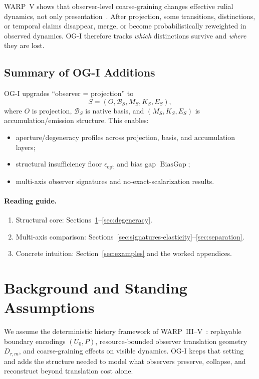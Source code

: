 \documentclass[11pt,twoside]{article}
\theoremstyle{definition}
\DeclareMathOperator{\BiasGap}{BiasGap}
\begin{document}
WARP~V shows that observer-level coarse-graining changes effective rulial dynamics, not only presentation~\cite{ross_paper_v}. After projection, some transitions, distinctions, or temporal claims disappear, merge, or become probabilistically reweighted in observed dynamics. OG-I therefore tracks \emph{which} distinctions survive and \emph{where} they are lost.

\subsection{Summary of OG-I Additions}
\label{subsec:tldr-og1}

OG-I upgrades ``observer = projection'' to
\[
  S=(O,\mathcal{B}_S,M_S,K_S,E_S),
\]
where \(O\) is projection, \(\mathcal{B}_S\) is native basis, and \((M_S,K_S,E_S)\) is accumulation/emission structure. This enables:
\begin{itemize}[leftmargin=*]
  \item aperture/degeneracy profiles across projection, basis, and accumulation layers;
  \item structural insufficiency floor \(\epsilon_{\mathrm{opt}}\) and bias gap \(\BiasGap\);
  \item multi-axis observer signatures and no-exact-scalarization results.
\end{itemize}

\paragraph{Reading guide.}
\begin{enumerate}[leftmargin=*]
  \item Structural core: Sections~\ref{sec:background}--\ref{sec:degeneracy}.
  \item Multi-axis comparison: Sections~\ref{sec:signatures-elasticity}--\ref{sec:separation}.
  \item Concrete intuition: Section~\ref{sec:examples} and the worked appendices.
\end{enumerate}

\section{Background and Standing Assumptions}
\label{sec:background}

We assume the deterministic history framework of WARP~III--V~\cite{ross_paper_iii,ross_paper_iv,ross_paper_v}: replayable boundary encodings \((U_0,P)\), resource-bounded observer translation geometry \(D_{\tau,m}\), and coarse-graining effects on visible dynamics. OG-I keeps that setting and adds the structure needed to model what observers preserve, collapse, and reconstruct beyond translation cost alone.
\end{document}
